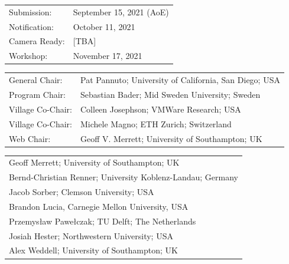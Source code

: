 \documentclass[a4paper,10pt]{scrartcl}
\begin{document}
\vskip4mm
\begin{minipage}{.49\textwidth}
\begin{tcolorbox}[boxsep=0pt, top=2mm, left=2mm, right=2mm, bottom=0mm, arc=5pt, auto outer arc, colback=cfp_lightcolor, colframe=white]
  \renewcommand{\baselinestretch}{0.95} 
  \footnotesize
  \setlength\tabcolsep{0pt}
  \begin{tabular}{p{2.0cm}l}
    Submission:   &  September 15, 2021 (AoE) \\
    Notification: &  October 11, 2021 \\
    Camera Ready: &  [TBA] \\
    Workshop:     &  November 17, 2021\\
  \end{tabular}
  
  \vskip1mm
  \begin{tabular}{p{2.0cm}l}
  General Chair:       & Pat Pannuto; University of California, San Diego; USA \\     %
  Program Chair:       & Sebastian Bader; Mid Sweden University; Sweden \\     %
  Village Co-Chair:    & Colleen Josephson; VMWare Research; USA \\
  Village Co-Chair:    & Michele Magno; ETH Zurich; Switzerland \\
  Web Chair:           & Geoff V. Merrett; University of Southampton; UK
  \end{tabular}

  \vskip1mm
  \begin{tabular}{l}
  Geoff Merrett; University of Southampton; UK \\
  Bernd-Christian Renner; University Koblenz-Landau; Germany \\
  Jacob Sorber; Clemson University; USA \\
  Brandon Lucia, Carnegie Mellon University, USA \\
  Przemys\textsf{\l{}}aw Pawe\textsf{\l{}}czak; TU Delft; The Netherlands \\
  Josiah Hester; Northwestern University; USA \\
  Alex Weddell; University of Southampton; UK \\
  \end{tabular}


\end{tcolorbox}
\end{minipage}
\end{document}
